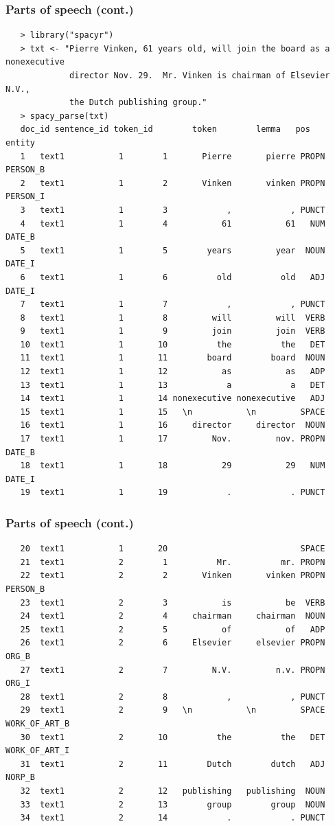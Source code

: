 \documentclass[11pt,handout]{beamer}
\begin{document}
\begin{frame}[fragile]
 \frametitle{Parts of speech (cont.)}
 \scriptsize
 \begin{verbatim}
   > library("spacyr")
   > txt <- "Pierre Vinken, 61 years old, will join the board as a nonexecutive
             director Nov. 29.  Mr. Vinken is chairman of Elsevier N.V.,
             the Dutch publishing group."
   > spacy_parse(txt)
   doc_id sentence_id token_id        token        lemma   pos        entity
   1   text1           1        1       Pierre       pierre PROPN      PERSON_B
   2   text1           1        2       Vinken       vinken PROPN      PERSON_I
   3   text1           1        3            ,            , PUNCT
   4   text1           1        4           61           61   NUM        DATE_B
   5   text1           1        5        years         year  NOUN        DATE_I
   6   text1           1        6          old          old   ADJ        DATE_I
   7   text1           1        7            ,            , PUNCT
   8   text1           1        8         will         will  VERB
   9   text1           1        9         join         join  VERB
   10  text1           1       10          the          the   DET
   11  text1           1       11        board        board  NOUN
   12  text1           1       12           as           as   ADP
   13  text1           1       13            a            a   DET
   14  text1           1       14 nonexecutive nonexecutive   ADJ
   15  text1           1       15   \n           \n         SPACE
   16  text1           1       16     director     director  NOUN
   17  text1           1       17         Nov.         nov. PROPN        DATE_B
   18  text1           1       18           29           29   NUM        DATE_I
   19  text1           1       19            .            . PUNCT
 \end{verbatim}
\end{frame}

\begin{frame}[fragile]
 \frametitle{Parts of speech (cont.)}
 \scriptsize
 \begin{verbatim}
   20  text1           1       20                           SPACE
   21  text1           2        1          Mr.          mr. PROPN
   22  text1           2        2       Vinken       vinken PROPN      PERSON_B
   23  text1           2        3           is           be  VERB
   24  text1           2        4     chairman     chairman  NOUN
   25  text1           2        5           of           of   ADP
   26  text1           2        6     Elsevier     elsevier PROPN         ORG_B
   27  text1           2        7         N.V.         n.v. PROPN         ORG_I
   28  text1           2        8            ,            , PUNCT
   29  text1           2        9   \n           \n         SPACE WORK_OF_ART_B
   30  text1           2       10          the          the   DET WORK_OF_ART_I
   31  text1           2       11        Dutch        dutch   ADJ        NORP_B
   32  text1           2       12   publishing   publishing  NOUN
   33  text1           2       13        group        group  NOUN
   34  text1           2       14            .            . PUNCT
 \end{verbatim}
\end{frame}
\end{document}
